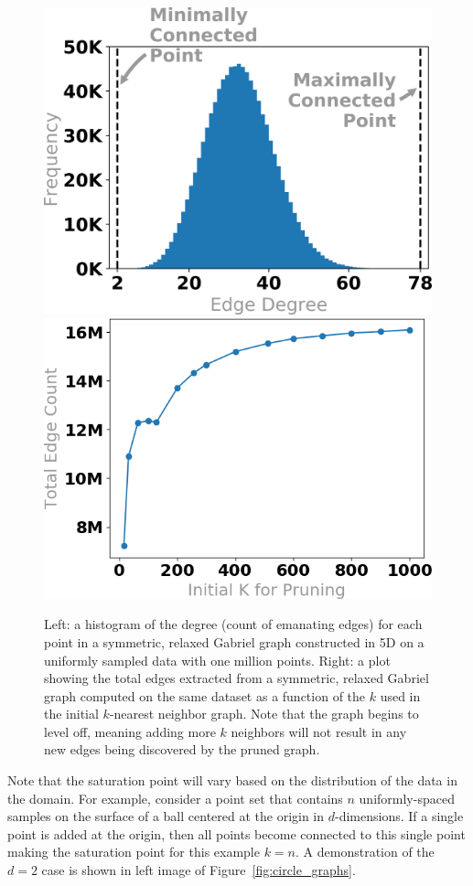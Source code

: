 \begin{figure}[htbp]
    \centering
      \includegraphics[width=.45\linewidth]{figs/chap7/n-1M_d-5_s-0_k-1000_relaxed_gabriel_histogram.png}
      \includegraphics[width=.45\linewidth]{figs/chap7/saturation_1000000_5D.png}
     \caption{
     Left: a histogram of the degree (count of emanating edges) for each point in a symmetric, relaxed Gabriel graph constructed in 5D on a uniformly sampled data with one million points.
     Right: a plot showing the total edges extracted from a symmetric, relaxed Gabriel graph computed on the same dataset as a function of the $k$ used in the initial $k$-nearest neighbor graph.
     Note that the graph begins to level off, meaning adding more $k$ neighbors will not result in any new edges being discovered by the pruned graph.
     }
    \label{fig:graph_degree}
    \vspace{-4mm}
  \end{figure}

Note that the saturation point will vary based on the distribution of the data
in the domain.
%
For example, consider a point set that contains $n$ uniformly-spaced samples
on the surface of a ball centered at the origin in $d$-dimensions.
%
If a single point is added at the origin, then all points become connected to
this single point making the saturation point for this example $k=n$.
%
A demonstration of the $d=2$ case is shown in left image of Figure~\ref{fig:circle_graphs}.

